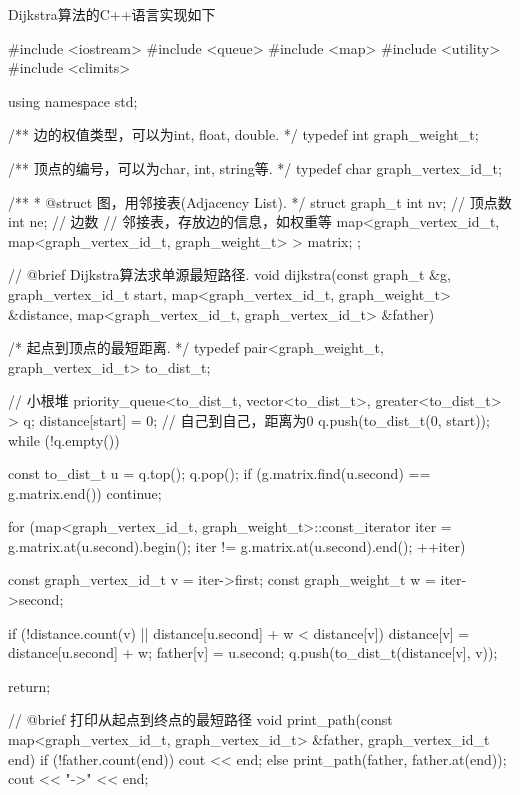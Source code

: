 Dijkstra算法的C++语言实现如下
\begin{Codex}[label=al_graph_dijkstra.cpp]
    #include <iostream>
    #include <queue>
    #include <map>
    #include <utility>
    #include <climits>

    using namespace std;

    /** 边的权值类型，可以为int, float, double. */
    typedef int graph_weight_t;

    /** 顶点的编号，可以为char, int, string等. */
    typedef char graph_vertex_id_t;

    /**
     * @struct 图，用邻接表(Adjacency List).
     */
    struct graph_t {
        int nv; // 顶点数
        int ne; // 边数
        // 邻接表，存放边的信息，如权重等
        map<graph_vertex_id_t, map<graph_vertex_id_t, graph_weight_t> > matrix;
    };


    // @brief Dijkstra算法求单源最短路径.
    void dijkstra(const graph_t &g, graph_vertex_id_t start,
            map<graph_vertex_id_t, graph_weight_t> &distance,
            map<graph_vertex_id_t, graph_vertex_id_t> &father) {
        /* 起点到顶点的最短距离. */
        typedef pair<graph_weight_t, graph_vertex_id_t> to_dist_t;

        // 小根堆
        priority_queue<to_dist_t, vector<to_dist_t>, greater<to_dist_t> > q;
        distance[start] = 0;  // 自己到自己，距离为0
        q.push(to_dist_t(0, start));
        while (!q.empty()) {
            const to_dist_t u = q.top(); q.pop();
            if (g.matrix.find(u.second) == g.matrix.end()) continue;

            for (map<graph_vertex_id_t, graph_weight_t>::const_iterator iter =
                    g.matrix.at(u.second).begin();
                    iter != g.matrix.at(u.second).end(); ++iter) {
                const graph_vertex_id_t v = iter->first;
                const graph_weight_t w = iter->second;

                if (!distance.count(v) || distance[u.second] + w < distance[v]) {
                    distance[v] = distance[u.second] + w;
                    father[v] = u.second;
                    q.push(to_dist_t(distance[v], v));
                }
            }
        }
        return;
    }

    // @brief 打印从起点到终点的最短路径
    void print_path(const map<graph_vertex_id_t, graph_vertex_id_t> &father,
            graph_vertex_id_t end) {
        if (!father.count(end)) {
            cout << end;
        } else {
            print_path(father, father.at(end));
            cout << "->" << end;
        }
    }


\end{Codex}

